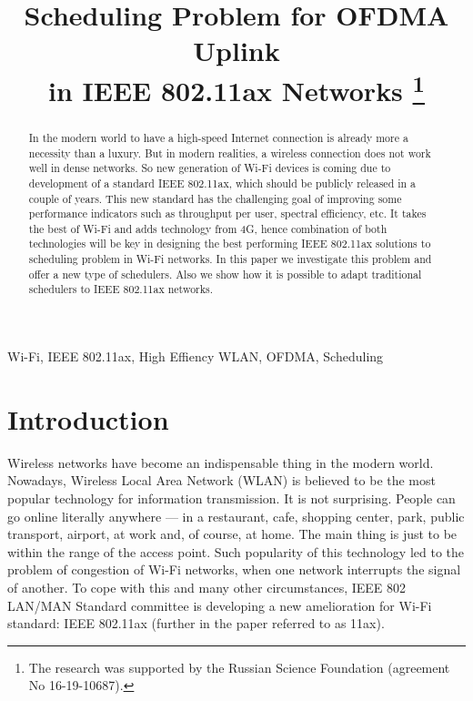
%


\IEEEoverridecommandlockouts

\title{%
Scheduling Problem for OFDMA Uplink \\in IEEE 802.11ax Networks
\thanks{The research was supported by the Russian Science Foundation (agreement No 16-19-10687).}}

\author{
}

\maketitle

\begin{abstract}
In the modern world to have a high-speed Internet connection is already more a necessity than a luxury. 
But in modern realities, a wireless connection does not work well in dense networks. 
So new generation of Wi-Fi devices is coming due to development of a standard IEEE 802.11ax, which should be publicly released in a couple of years. 
This new standard has the challenging goal of improving some performance indicators such as throughput per user, spectral efficiency, etc. 
It takes the best of Wi-Fi and adds technology from 4G, hence combination of both technologies will be key in designing the best performing IEEE 802.11ax solutions to scheduling problem in Wi-Fi networks. 
In this paper we investigate this problem and offer a new type of schedulers. Also we show how it is possible to adapt traditional schedulers to  IEEE 802.11ax networks.
\end{abstract}

\begin{IEEEkeywords}
Wi-Fi, IEEE 802.11ax, High Effiency WLAN, OFDMA, Scheduling
\end{IEEEkeywords}

\section{Introduction}

Wireless networks have become an indispensable thing in the modern world.
Nowadays, Wireless Local Area Network (WLAN) is believed to be the most popular technology for information transmission. 
It is not surprising. 
People can go online literally anywhere --- in a restaurant, cafe, shopping center, park, public transport, airport, at work and, of course, at home. 
The main thing is just to be within the range of the access point. 
Such popularity of this technology led to the problem of congestion of Wi-Fi networks, when one network interrupts the signal of another. 
To cope with this and many other circumstances, IEEE 802 LAN/MAN Standard committee is developing a new amelioration for Wi-Fi standard: IEEE 802.11ax (further in the paper referred to as 11ax). 

